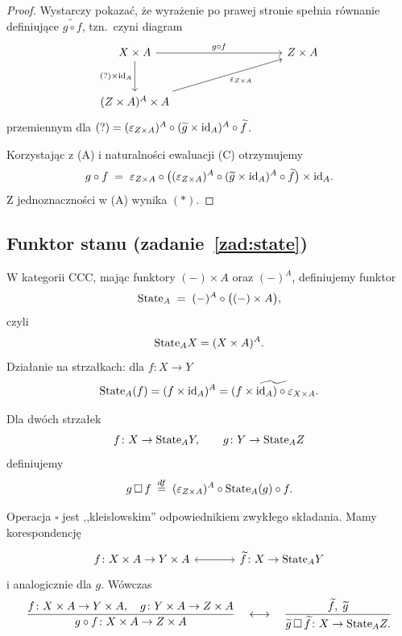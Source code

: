 \begin{proof}
Wystarczy pokazać, że wyrażenie po prawej stronie spełnia równanie definiujące $\widetilde{g \circ f}$, tzn.\ czyni diagram
\[
\begin{tikzcd}[column sep=huge, row sep=large]
X \times A \arrow[rr, "g\circ f"] \arrow[d, "(?)\times \id_A"'] & & Z \times A \\
(Z \times A)^A \times A \arrow[urr, "\varepsilon_{Z\times A}"'] & &
\end{tikzcd}
\]
przemiennym dla $(?) = (\varepsilon_{Z\times A})^A \circ (\widetilde{g} \times \mathrm{id}_A)^A \circ \widetilde{f}$.

Korzystając z (A) i naturalności ewaluacji (C) otrzymujemy
\[
g \circ f \;=\; \varepsilon_{Z\times A} \circ \bigl((\varepsilon_{Z\times A})^A \circ (\widetilde{g}\times\mathrm{id}_A)^A \circ \widetilde{f}\bigr)\times \mathrm{id}_A.
\]
Z jednoznaczności w (A) wynika $(*)$.
\end{proof}

\subsection*{Funktor stanu (zadanie~\ref{zad:state})}

\begin{definicja}
W kategorii CCC, mając funktory $(-)\times A$ oraz $(-)^A$, definiujemy funktor
\[
\mathrm{State}_A \;=\; (-)^A \circ \bigl((-)\times A\bigr),
\]
czyli
\[
\mathrm{State}_A X = (X\times A)^A.
\]
Działanie na strzałkach: dla $f\colon X\to Y$
\[
\mathrm{State}_A(f) = (f\times \mathrm{id}_A)^A = \widetilde{(f\times \mathrm{id}_A)\circ \varepsilon_{X\times A}}.
\]
\end{definicja}

\begin{definicja}
Dla dwóch strzałek
\[
f \colon X \to \mathrm{State}_A Y, \qquad g \colon Y \to \mathrm{State}_A Z
\]
definiujemy
\[
g \,\square\, f \;\stackrel{df}{=}\; (\varepsilon_{Z\times A})^A \circ \mathrm{State}_A(g) \circ f.
\]
\end{definicja}

\begin{uwaga}
Operacja $\square$ jest ,,kleislowskim'' odpowiednikiem zwykłego składania. Mamy korespondencję
\[
\begin{tikzcd}[column sep=large]
f\colon X\times A \to Y\times A \arrow[r, leftrightarrow] & \widetilde{f}\colon X \to \State_A Y
\end{tikzcd}
\]
i analogicznie dla $g$. Wówczas
\[
\frac{f\colon X\times A\to Y\times A,\quad g\colon Y\times A \to Z\times A}{g\circ f\colon X\times A \to Z\times A}
\quad\longleftrightarrow\quad
\frac{\widetilde{f},\; \widetilde{g}}{\widetilde{g}\,\square\,\widetilde{f}\colon X\to \mathrm{State}_A Z.}
\]
\end{uwaga}

